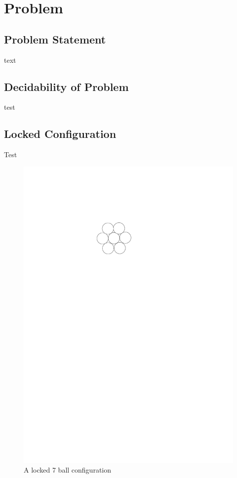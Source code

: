 \section{Problem}
\subsection{Problem Statement} text
\subsection{Decidability of Problem} test
\subsection{Locked Configuration}
Test
\begin{figure}[ht]
\begin{center}
\includegraphics{graphics/7ballLocked.pdf}
\caption{A locked 7 ball configuration}
\end{center} 
\end{figure}
\newpage